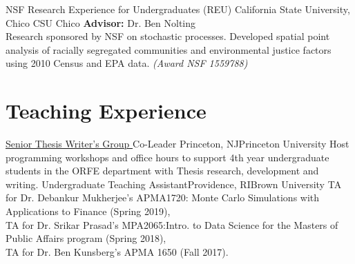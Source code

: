 \documentclass[10pt,a4paper,roman]{moderncv}        %
\begin{document}
{NSF Research Experience for Undergraduates (REU)}
{California State University, Chico}
{CSU Chico}
{\textbf{Advisor:} Dr. Ben Nolting
  \\
 Research sponsored by NSF on stochastic processes.
  Developed spatial point analysis of racially segregated communities
  and environmental justice factors using 2010 Census and EPA data.
\textit{(Award NSF 1559788)}}

\section{Teaching Experience}
{\color{blue}\href{https://orfe.princeton.edu/undergraduate/stwg}{Senior Thesis
    Writer's Group }\color{black} Co-Leader}
{Princeton, NJ}{Princeton University}
{Host programming workshops and office hours to support
  4th year undergraduate students in the ORFE department with Thesis research, development and writing.}
{Undergraduate Teaching Assistant}{Providence, RI}{Brown University}
{TA for Dr. Debankur Mukherjee's APMA1720: Monte Carlo Simulations with Applications to Finance (Spring 2019), \\
TA for Dr. Srikar Prasad's MPA2065:Intro. to Data Science for the Masters of Public Affairs program (Spring 2018),
\\
TA for Dr. Ben Kunsberg's APMA 1650 (Fall 2017).
}
\end{document}
